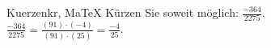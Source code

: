 \begin{MAufgabe}{Kuerzen}{kr, MaTeX}
K\"urzen Sie soweit m\"oglich: $\frac{-364}{2275}$.\\ 
\ifLsg\MLoesung
\quad $\frac{-364}{2275}=\frac{(91)\cdot(-4)}{(91)\cdot(25)}=\frac{-4}{25}$.\else\relax\fi
 \end{MAufgabe}